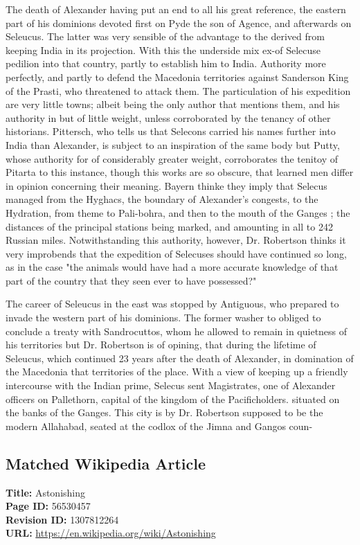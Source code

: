 \documentclass{article}
\begin{document}
The death of Alexander having put an end to all his great reference, the eastern part of his dominions devoted first on Pyde the son of Agence, and afterwards on Seleucus. The latter was very sensible of the advantage to the derived from keeping India in its projection. With this the underside mix ex-of Selecuse pedilion into that country, partly to establish him to India. Authority more perfectly, and partly to defend the Macedonia territories against Sanderson King of the Prasti, who threatened to attack them. The particulation of his expedition are very little towns; albeit being the only author that mentions them, and his authority in but of little weight, unless corroborated by the tenancy of other historians. Pittersch, who tells us that Selecons carried his names further into India than Alexander, is subject to an inspiration of the same body but Putty, whose authority for of considerably greater weight, corroborates the tenitoy of Pitarta to this instance, though this works are so obscure, that learned men differ in opinion concerning their meaning. Bayern thinke they imply that Selecus managed from the Hyghacs, the boundary of Alexander’s congests, to the Hydration, from theme to Pali-bohra, and then to the mouth of the Ganges ; the distances of the principal stations being marked, and amounting in all to 242 Russian miles. Notwithstanding this authority, however, Dr. Robertson thinks it very improbends that the expedition of Selecuses should have continued so long, as in the case "the animals would have had a more accurate knowledge of that part of the country that they seen ever to have possessed?"

The career of Seleucus in the east was stopped by Antiguous, who prepared to invade the western part of his dominions. The former washer to obliged to conclude a treaty with Sandrocuttos, whom he allowed to remain in quietness of his territories but Dr. Robertson is of opining, that during the lifetime of Seleucus, which continued 23 years after the death of Alexander, in domination of the Macedonia that territories of the place. With a view of keeping up a friendly intercourse with the Indian prime, Selecus sent Magistrates, one of Alexander officers on Pallethorn, capital of the kingdom of the Pacificholders. situated on the banks of the Ganges. This city is by Dr. Robertson supposed to be the modern Allahabad, seated at the codlox of the Jimna and Gangos coun-

\subsection*{Matched Wikipedia Article}
\textbf{Title:} Astonishing \\
\textbf{Page ID:} 56530457 \\
\textbf{Revision ID:} 1307812264 \\
\textbf{URL:} \url{https://en.wikipedia.org/wiki/Astonishing}
\end{document}
